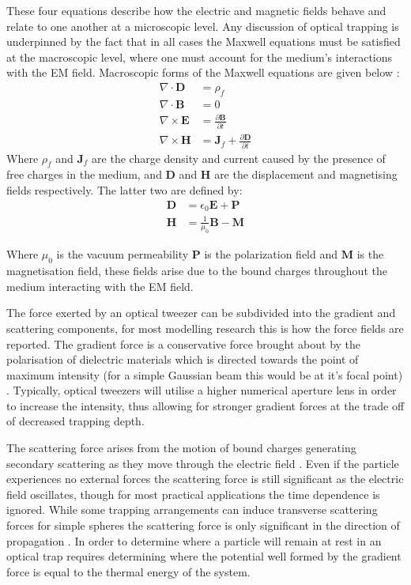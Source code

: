 These four equations describe how the electric and magnetic fields 
behave and relate to one another at a microscopic level. Any 
discussion of optical trapping is underpinned by the fact that in 
all cases the Maxwell equations must be satisfied at the macroscopic 
level, where one must account for the medium's interactions with the 
EM field. Macroscopic forms of the Maxwell equations are given below
\cite{Jackson_1975}:
\begin{align}
	\nabla \cdot \mathbf{D}
	&= \rho_f
	\\
	\nabla \cdot \mathbf{B}
	&= 0
	\\
	\nabla \times \mathbf{E}
	&= \frac{\partial \mathbf{B}}{\partial t}
	\\
	\nabla \times \mathbf{H}
	&= \mathbf{J}_f +\frac{\partial \mathbf{D}}{\partial t}  
\end{align}
Where $\rho_f$ and $\mathbf{J}_f$ are the charge density and 
current caused by the presence of free charges in the medium, 
and $\mathbf{D}$ and $\mathbf{H}$ are the displacement and 
magnetising fields respectively. The latter two are defined 
by:
\begin{align}
	\mathbf{D} &= \epsilon_0\mathbf{E}+\mathbf{P} 
	\\ 
	\mathbf{H} &= \frac{1}{\mu_0}\mathbf{B}-\mathbf{M}
\end{align}

Where $\mu_0$ is the vacuum permeability $\mathbf{P}$ 
is the polarization field and $\mathbf{M}$ is the 
magnetisation field, these fields arise due to the 
bound charges throughout the medium interacting with 
the EM field. 

The force exerted by an optical tweezer can be subdivided into 
the gradient and scattering components, for most modelling 
research this is how the force fields are reported. The gradient 
force is a conservative force brought about by the polarisation 
of dielectric materials which is directed towards the point of 
maximum intensity (for a simple Gaussian beam this would be at 
it's focal point) \cite{YasuhiroHarada1996}. Typically, optical 
tweezers will utilise a higher numerical aperture lens in order 
to increase the intensity, thus allowing for stronger gradient 
forces at the trade off of decreased trapping depth.

The scattering force arises from the motion of bound charges 
generating secondary scattering as they move through the 
electric field \cite{YasuhiroHarada1996}. Even if the particle
experiences no external forces the scattering force is still 
significant as the electric field oscillates, though for most
practical applications the time dependence is ignored. While 
some trapping arrangements can induce transverse scattering 
forces for simple spheres the scattering force is only 
significant in the direction of propagation \cite{Capitanio2002}.
In order to determine where a particle will remain at rest 
in an optical trap requires determining where the potential 
well formed by the gradient force is equal to the thermal 
energy of the system. 

